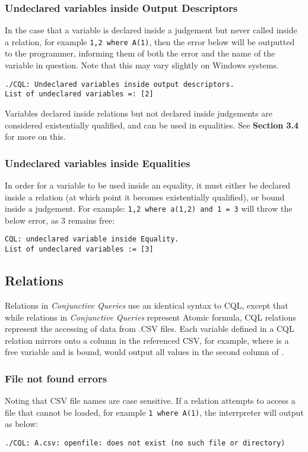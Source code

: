 \subsubsection{Undeclared variables inside Output Descriptors}
In the case that a variable is declared inside a judgement but never called inside a relation, for example \lstinline!1,2 where A(1)!, then the error below will be outputted to the programmer, informing them of both the error and the name of the variable in question. Note that this may vary slightly on Windows systems.
\begin{lstlisting}[style=framed]
./CQL: Undeclared variables inside output descriptors.
List of undeclared variables =: [2]
\end{lstlisting}
Variables declared inside relations but not declared inside judgements are considered existentially qualified, and can be used in equalities. See \textbf{Section 3.4} for more on this.

\subsubsection{Undeclared variables inside Equalities}
In order for a variable to be used inside an equality, it must either be declared inside a relation (at which point it becomes existentially qualified), or bound inside a judgement. For example: \lstinline!1,2 where a(1,2) and 1 = 3! will throw the below error, as 3 remains free:
\begin{lstlisting}[style=framed]
CQL: undeclared variable inside Equality.
List of undeclared variables := [3]
\end{lstlisting}

\subsection{Relations}
Relations in \textit{Conjunctive Queries} use an identical syntax to CQL, except that while relations in \textit{Conjunctive Queries} represent Atomic formula, CQL relations represent the accessing of data from .CSV files.  Each variable defined in a CQL relation mirrors onto a column in the referenced CSV, for example,  where  is a free variable and  is bound, would output all values in the second column of . 

\subsubsection{File not found errors}
Noting that CSV file names are case sensitive. If a relation attempts to access a file that cannot be loaded, for example \lstinline!1 where A(1)!, the interrpreter will output as below:
\begin{lstlisting}[style=framed]
./CQL: A.csv: openfile: does not exist (no such file or directory)
\end{lstlisting}

